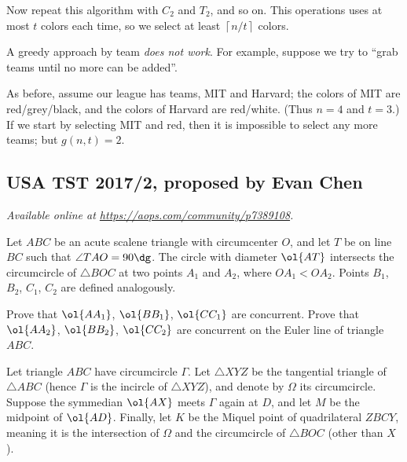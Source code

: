 \documentclass[11pt]{scrartcl}
\begin{document}
Now repeat this algorithm with $C_2$ and $T_2$, and so on.
This operations uses at most $t$ colors each time,
so we select at least $\left\lceil n/t \right\rceil$ colors.

\begin{remark*}
  A greedy approach by team \emph{does not work}.
  For example, suppose we try to ``grab teams until no more can be added''.

  As before, assume our league has teams, MIT and Harvard;
  the colors of MIT are red/grey/black, and
  the colors of Harvard are red/white.
  (Thus $n=4$ and $t=3$.)
  If we start by selecting MIT and red, then
  it is impossible to select any more teams; but $g(n,t) = 2$.
\end{remark*}
\pagebreak

\subsection{USA TST 2017/2, proposed by Evan Chen}
\textsl{Available online at \url{https://aops.com/community/p7389108}.}
\begin{mdframed}[style=mdpurplebox,frametitle={Problem statement}]
Let $ABC$ be an acute scalene triangle with circumcenter $O$,
and let $T$ be on line $BC$ such that $\angle TAO = 90\dg$.
The circle with diameter $\ol{AT}$
intersects the circumcircle of $\triangle BOC$ at two points
$A_1$ and $A_2$, where $OA_1 < OA_2$.
Points $B_1$, $B_2$, $C_1$, $C_2$ are defined analogously.
\begin{enumerate}
  \ii[(a)]
  Prove that $\ol{AA_1}$, $\ol{BB_1}$, $\ol{CC_1}$ are concurrent.
  \ii[(b)]
  Prove that $\ol{AA_2}$, $\ol{BB_2}$, $\ol{CC_2}$ are concurrent
  on the Euler line of triangle $ABC$.
\end{enumerate}
\end{mdframed}
Let triangle $ABC$ have circumcircle $\Gamma$.
Let $\triangle XYZ$ be the tangential triangle of $\triangle ABC$
(hence $\Gamma$ is the incircle of $\triangle XYZ$),
and denote by $\Omega$ its circumcircle.
Suppose the symmedian $\ol{AX}$ meets $\Gamma$ again at $D$,
and let $M$ be the midpoint of $\ol{AD}$.
Finally, let $K$ be the Miquel point of quadrilateral $ZBCY$,
meaning it is the intersection of $\Omega$
and the circumcircle of $\triangle BOC$ (other than $X$).
\end{document}
